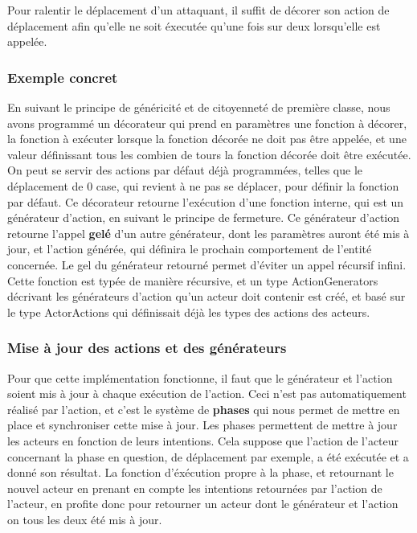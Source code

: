 \documentclass{article}
\begin{document}
Pour ralentir le déplacement d'un attaquant, il suffit de décorer son action de déplacement afin qu'elle ne soit éxecutée qu'une fois sur deux lorsqu'elle est appelée.

\subsubsection{Exemple concret}

En suivant le principe de généricité et de citoyenneté de première classe, nous avons programmé un décorateur qui prend en paramètres une fonction à décorer, la fonction à exécuter lorsque la fonction décorée ne doit pas être appelée, et une valeur définissant tous les combien de tours la fonction décorée doit être exécutée. On peut se servir des actions par défaut déjà programmées, telles que le déplacement de 0 case, qui revient à ne pas se déplacer, pour définir la fonction par défaut.
Ce décorateur retourne l'exécution d'une fonction interne, qui est un générateur d'action, en suivant le principe de fermeture. Ce générateur d'action retourne l'appel \textbf{gelé} d'un autre générateur, dont les paramètres auront été mis à jour, et l'action générée, qui définira le prochain comportement de l'entité concernée. Le gel du générateur retourné permet d'éviter un appel récursif infini. Cette fonction est typée de manière récursive, et un type ActionGenerators décrivant les générateurs d'action qu'un acteur doit contenir est créé, et basé sur le type ActorActions qui définissait déjà les types des actions des acteurs.

\subsubsection{Mise à jour des actions et des générateurs}

Pour que cette implémentation fonctionne, il faut que le générateur et l'action soient mis à jour à chaque exécution de l'action. Ceci n'est pas automatiquement réalisé par l'action, et c'est le système de \textbf{phases} qui nous permet de mettre en place et synchroniser cette mise à jour.
Les phases permettent de mettre à jour les acteurs en fonction de leurs intentions. Cela suppose que l'action de l'acteur concernant la phase en question, de déplacement par exemple, a été exécutée et a donné son résultat. La fonction d'éxécution propre à la phase, et retournant le nouvel acteur en prenant en compte les intentions retournées par l'action de l'acteur, en profite donc pour retourner un acteur dont le générateur et l'action on tous les deux été mis à jour.
\end{document}
